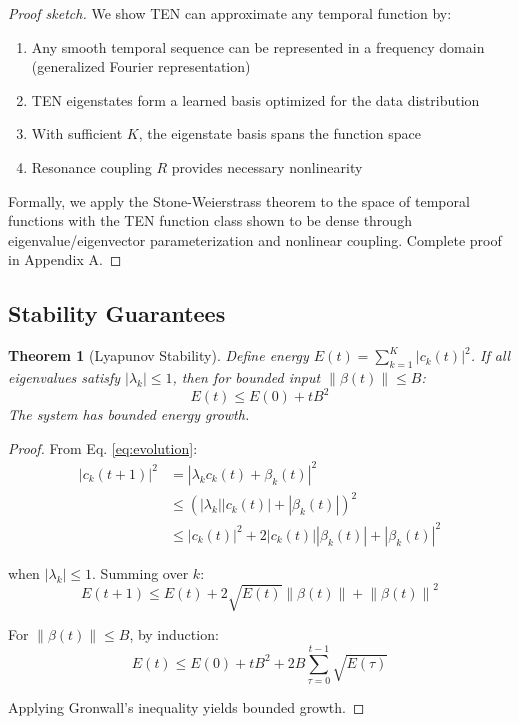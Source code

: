 \documentclass[11pt,letterpaper]{article}
\newtheorem{theorem}{Theorem}
\newcommand{\norm}[1]{\left\|#1\right\|}
\begin{document}
\begin{proof}[Proof sketch]
We show TEN can approximate any temporal function by:
\begin{enumerate}
    \item Any smooth temporal sequence can be represented in a frequency domain (generalized Fourier representation)
    \item TEN eigenstates form a learned basis optimized for the data distribution
    \item With sufficient $K$, the eigenstate basis spans the function space
    \item Resonance coupling $R$ provides necessary nonlinearity
\end{enumerate}

Formally, we apply the Stone-Weierstrass theorem to the space of temporal functions with the TEN function class shown to be dense through eigenvalue/eigenvector parameterization and nonlinear coupling. Complete proof in Appendix A.
\end{proof}

\subsection{Stability Guarantees}

\begin{theorem}[Lyapunov Stability]
\label{thm:stability}
Define energy $E(t) = \sum_{k=1}^{K} |c_k(t)|^2$. If all eigenvalues satisfy $|\lambda_k| \leq 1$, then for bounded input $\norm{\beta(t)} \leq B$:
\begin{equation}
    E(t) \leq E(0) + tB^2
\end{equation}
The system has bounded energy growth.
\end{theorem}

\begin{proof}
From Eq. \ref{eq:evolution}:
\begin{align}
    |c_k(t+1)|^2 &= |\lambda_k c_k(t) + \beta_k(t)|^2 \\
    &\leq (|\lambda_k||c_k(t)| + |\beta_k(t)|)^2 \\
    &\leq |c_k(t)|^2 + 2|c_k(t)||\beta_k(t)| + |\beta_k(t)|^2
\end{align}

when $|\lambda_k| \leq 1$. Summing over $k$:
\begin{equation}
    E(t+1) \leq E(t) + 2\sqrt{E(t)} \norm{\beta(t)} + \norm{\beta(t)}^2
\end{equation}

For $\norm{\beta(t)} \leq B$, by induction:
\begin{equation}
    E(t) \leq E(0) + tB^2 + 2B\sum_{\tau=0}^{t-1}\sqrt{E(\tau)}
\end{equation}

Applying Gronwall's inequality yields bounded growth.
\end{proof}
\end{document}
